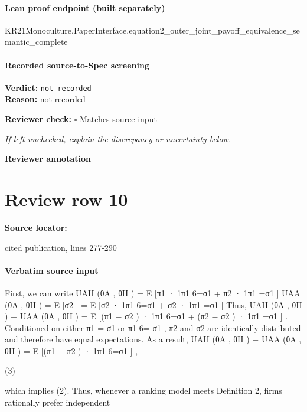 \documentclass[10pt]{article}
\newcommand{\reviewerbox}{%
  \par\noindent\fbox{\parbox{0.96\linewidth}{\rule{0pt}{0.38in}}}\par
}
\newcommand{\reviewmatch}[1]{%
  \par\noindent\textbf{Reviewer check:} $\square$\; #1\par
  \noindent\emph{If left unchecked, explain the discrepancy or uncertainty below.}\par
}
\begin{document}
\paragraph{Lean proof endpoint (built separately)}\begin{ReviewVerbatim}
KR21Monoculture.PaperInterface.equation2_outer_joint_payoff_equivalence_semantic_complete
\end{ReviewVerbatim}

\paragraph{Recorded source-to-Spec screening}
\textbf{Verdict:} \texttt{not recorded}
\\
\textbf{Reason:} not recorded
\reviewmatch{Matches source input}
\noindent\textbf{Reviewer annotation}\par
\reviewerbox
\clearpage
\hypertarget{source-claim-36b115610854f337}{}
\section*{Review row 10}
\textbf{Source locator:} {\footnotesize\raggedright cited publication, lines 277-\allowbreak{}290\par}
\paragraph{Verbatim source input}
\begin{ReviewVerbatim}
First, we can write
UAH (θA , θH ) = E [π1 · 1π1 6=σ1 + π2 · 1π1 =σ1 ]
UAA (θA , θH ) = E [σ2 ]
= E [σ2 · 1π1 6=σ1 + σ2 · 1π1 =σ1 ]
Thus,
UAH (θA , θH ) − UAA (θA , θH )
= E [(π1 − σ2 ) · 1π1 6=σ1 + (π2 − σ2 ) · 1π1 =σ1 ] .
Conditioned on either π1 = σ1 or π1 6= σ1 , π2 and σ2 are identically distributed and therefore have equal
expectations. As a result,
UAH (θA , θH ) − UAA (θA , θH ) = E [(π1 − π2 ) · 1π1 6=σ1 ] ,

(3)

which implies (2). Thus, whenever a ranking model meets Definition 2, firms rationally prefer independent
\end{ReviewVerbatim}
\end{document}
